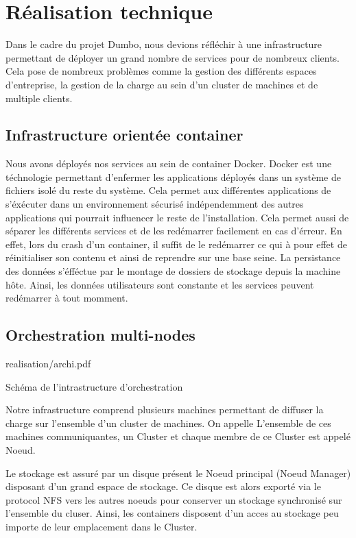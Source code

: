 \section{Réalisation technique}

Dans le cadre du projet Dumbo, nous devions réfléchir à une infrastructure permettant de déployer un grand nombre de services pour de nombreux clients.
Cela pose de nombreux problèmes comme la gestion des différents espaces d'entreprise, la gestion de la charge au sein d'un cluster de machines et de multiple clients.

\subsection{Infrastructure orientée container}

Nous avons déployés nos services au sein de container Docker.
Docker est une téchnologie permettant d'enfermer les applications déployés dans un système de fichiers isolé du reste du système.
Cela permet aux différentes applications de s'éxécuter dans un environnement sécurisé indépendemment des autres applications qui pourrait influencer le reste de l'installation.
Cela permet aussi de séparer les différents services et de les redémarrer facilement en cas d'érreur.
En effet, lors du crash d'un container, il suffit de le redémarrer ce qui à pour effet de réinitialiser son contenu et ainsi de reprendre sur une base seine.
La persistance des données s'éfféctue par le montage de dossiers de stockage depuis la machine hôte.
Ainsi, les données utilisateurs sont constante et les services peuvent redémarrer à tout momment.

\subsection{Orchestration multi-nodes}

\begin{figue}{1}{realisation/archi.pdf}
\caption{Schéma de l'intrastructure d'orchestration}
\end{figue}

Notre infrastructure comprend plusieurs machines permettant de diffuser la charge sur l'ensemble d'un cluster de machines.
On appelle L'ensemble de ces machines communiquantes, un Cluster et chaque membre de ce Cluster est appelé Noeud.

Le stockage est assuré par un disque présent le Noeud principal (Noeud Manager) disposant d'un grand espace de stockage.
Ce disque est alors exporté via le protocol NFS vers les autres noeuds pour conserver un stockage synchronisé sur l'ensemble du cluser.
Ainsi, les containers disposent d'un acces au stockage peu importe de leur emplacement dans le Cluster.

